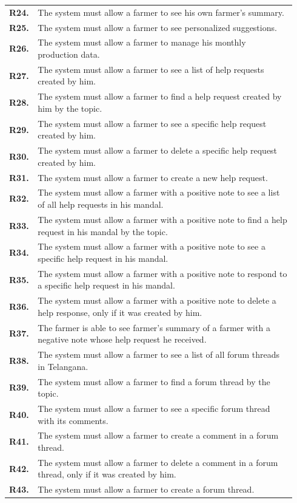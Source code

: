 \begin{longtable}{@{}p{0.06\linewidth} p{0.88\linewidth}}
		\textbf{R24.} & The system must allow a farmer to see his own farmer's summary.\\
		\textbf{R25.} & The system must allow a farmer to see personalized suggestions.\\
		\textbf{R26.} & The system must allow a farmer to manage his monthly production data.\\
		\textbf{R27.} & The system must allow a farmer to see a list of help requests created by him.\\
		\textbf{R28.} & The system must allow a farmer to find a help request created by him by the topic.\\
		\textbf{R29.} & The system must allow a farmer to see a specific help request created by him.\\
		\textbf{R30.} & The system must allow a farmer to delete a specific help request created by him.\\
		\textbf{R31.} & The system must allow a farmer to create a new help request.\\
		\textbf{R32.} & The system must allow a farmer with a positive note to see a list of all help requests in his mandal.\\
		\textbf{R33.} & The system must allow a farmer with a positive note to find a help request in his mandal by the topic.\\
		\textbf{R34.} & The system must allow a farmer with a positive note to see a specific help request in his mandal.\\
		\textbf{R35.} & The system must allow a farmer with a positive note to respond to a specific help request in his mandal.\\
		\textbf{R36.} & The system must allow a farmer with a positive note to delete a help response, only if it was created by him.\\
		\textbf{R37.} & The farmer is able to see farmer's summary of a farmer with a negative note whose help request he received. \\
		\textbf{R38.} & The system must allow a farmer to see a list of all forum threads in Telangana.\\
		\textbf{R39.} & The system must allow a farmer to find a forum thread by the topic.\\
		\textbf{R40.} & The system must allow a farmer to see a specific forum thread with its comments.\\
		\textbf{R41.} & The system must allow a farmer to create a comment in a forum thread.\\
		\textbf{R42.} & The system must allow a farmer to delete a comment in a forum thread, only if it was created by him.\\
		\textbf{R43.} & The system must allow a farmer to create a forum thread.\\
		

\end{longtable}
